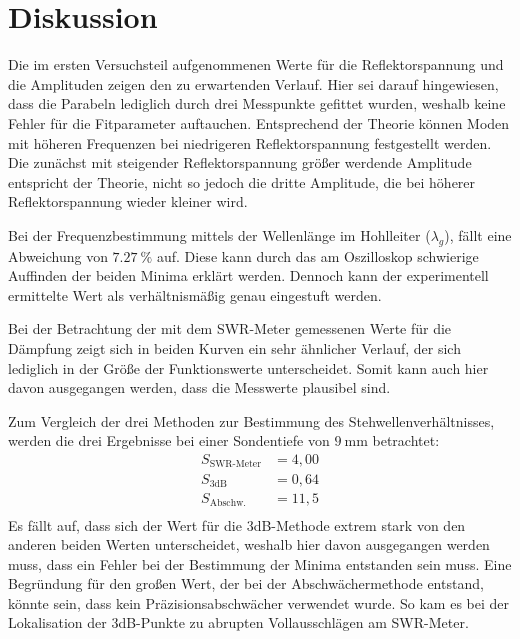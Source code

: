 \section{Diskussion}
Die im ersten Versuchsteil aufgenommenen Werte für die Reflektorspannung und die Amplituden
zeigen den zu erwartenden Verlauf. Hier sei darauf hingewiesen, dass die Parabeln
lediglich durch drei Messpunkte gefittet wurden, weshalb keine Fehler für die Fitparameter auftauchen.
Entsprechend der Theorie können Moden mit höheren Frequenzen bei niedrigeren Reflektorspannung festgestellt werden.
Die zunächst mit steigender Reflektorspannung größer werdende Amplitude entspricht der Theorie,
nicht so jedoch die dritte Amplitude, die bei höherer Reflektorspannung wieder kleiner wird.

\noindent Bei der Frequenzbestimmung mittels der Wellenlänge im Hohlleiter ($\lambda_{g}$), fällt
eine Abweichung von $\SI{7,27}{\percent}$ auf. Diese kann durch das am Oszilloskop schwierige
Auffinden der beiden Minima erklärt werden. Dennoch kann der experimentell ermittelte Wert als verhältnismäßig genau
eingestuft werden.

\noindent Bei der Betrachtung der mit dem SWR-Meter gemessenen Werte für die Dämpfung
zeigt sich in beiden Kurven ein sehr ähnlicher Verlauf, der sich lediglich in der Größe
der Funktionswerte unterscheidet. Somit kann auch hier davon ausgegangen werden, dass die
Messwerte plausibel sind.

\noindent
Zum Vergleich der drei Methoden zur Bestimmung des Stehwellenverhältnisses, werden die
drei Ergebnisse bei einer Sondentiefe von $\SI{9}{\mm}$ betrachtet:
\begin{align*}
    S_{\text{SWR-Meter}} &= 4,00    \\
    S_{\text{3dB}} &= 0,64          \\
    S_{\text{Abschw.}} &=11,5       \\
\end{align*}
Es fällt auf, dass sich der Wert für die 3dB-Methode extrem stark von den anderen beiden
Werten unterscheidet, weshalb hier davon ausgegangen werden muss, dass ein Fehler bei der Bestimmung der
Minima entstanden sein muss.
Eine Begründung für den großen Wert, der bei der Abschwächermethode entstand, könnte sein,
dass kein Präzisionsabschwächer verwendet wurde. So kam es bei der Lokalisation der 3dB-Punkte zu
abrupten Vollausschlägen am SWR-Meter.

\printbibliography
